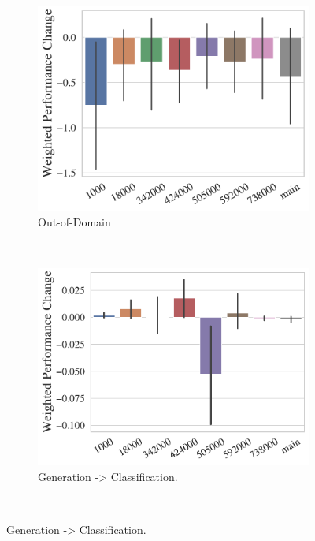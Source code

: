\begin{figure}[t!]
    \centering
    \begin{subfigure}[b]{0.3\textwidth}
    \includegraphics[width=\the\columnwidth]{figures/fig_files/ood/weighted_perf_change_ood.pdf}
        \caption{Out-of-Domain}
        \label{fig:perf-change-ood}
    \end{subfigure}%
    ~ 
    \begin{subfigure}[b]{0.3\textwidth}
        \centering
    \includegraphics[width=\the\columnwidth]{figures/fig_files/cross-task/weighted_perf_change_task_gen_to_clas.pdf}
        \caption{Generation -> Classification.}
        \label{fig:perf-change-gen-to-class}
    \end{subfigure}
    ~

\end{figure}
